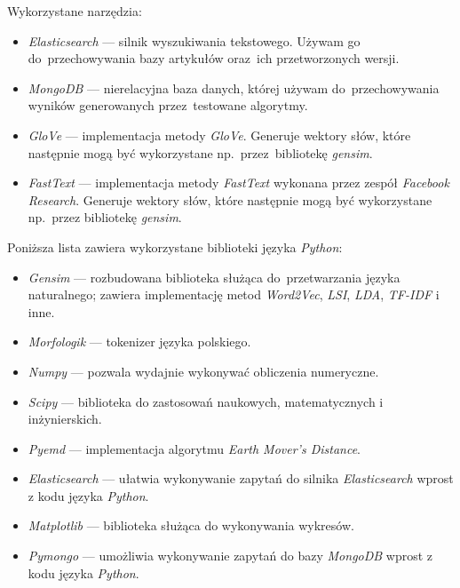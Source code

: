 \documentclass[pl]{minipw} %
\begin{document}
Wykorzystane narzędzia:
\begin{itemize}
	\item \textit{Elasticsearch} --- silnik wyszukiwania tekstowego. Używam go do~przechowywania bazy artykułów oraz~ich przetworzonych wersji.
	\item \textit{MongoDB} --- nierelacyjna baza danych, której używam do~przechowywania wyników generowanych przez~testowane algorytmy.
	\item \textit{GloVe} --- implementacja metody \textit{GloVe}. Generuje wektory słów, które następnie mogą być wykorzystane np.~przez~bibliotekę \textit{gensim}.
	\item \textit{FastText} --- implementacja metody \textit{FastText} wykonana przez zespół \textit{Facebook Research}. Generuje wektory słów, które następnie mogą być wykorzystane np.~przez bibliotekę \textit{gensim}.
\end{itemize}

Poniższa lista zawiera wykorzystane biblioteki języka \textit{Python}:
\begin{itemize}
	\item \textit{Gensim} --- rozbudowana biblioteka służąca do~przetwarzania języka naturalnego; zawiera implementację metod \textit{Word2Vec}, \textit{LSI}, \textit{LDA}, \textit{TF-IDF} i inne.
	\item \textit{Morfologik} --- tokenizer języka polskiego.
	\item \textit{Numpy} --- pozwala wydajnie wykonywać obliczenia numeryczne.
	\item \textit{Scipy} --- biblioteka do zastosowań naukowych, matematycznych i inżynierskich.
	\item \textit{Pyemd} --- implementacja algorytmu \textit{Earth Mover's Distance}.
	\item \textit{Elasticsearch} --- ułatwia wykonywanie zapytań do silnika \textit{Elasticsearch} wprost z kodu języka \textit{Python}.
	\item \textit{Matplotlib} --- biblioteka służąca do wykonywania wykresów.
	\item \textit{Pymongo} --- umożliwia wykonywanie zapytań do bazy \textit{MongoDB} wprost z kodu języka \textit{Python}.
\end{itemize}
\end{document}
